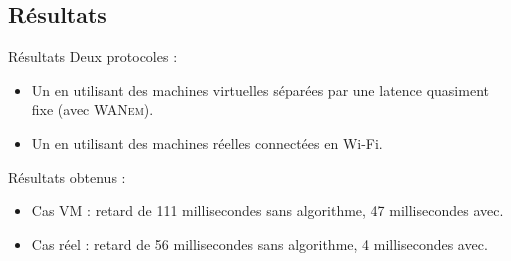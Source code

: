 \subsection{Résultats}
\begin{frame}{Résultats}
	Deux protocoles : 
	
	\begin{itemize}
		\item Un en utilisant des machines virtuelles séparées par une latence quasiment fixe (avec \textsc{WANem}).
		\item Un en utilisant des machines réelles connectées en Wi-Fi.
	\end{itemize}
	
	Résultats obtenus :
	\begin{itemize}
		\item Cas VM : retard de 111 millisecondes sans algorithme, 47 millisecondes avec.
		\item Cas réel : retard de 56 millisecondes sans algorithme, 4 millisecondes avec.
	\end{itemize}
\end{frame}

